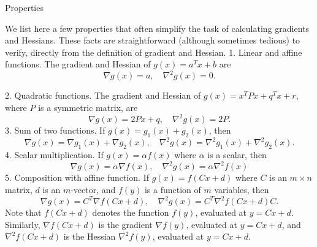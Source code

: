 Properties 


We list here a few properties that often simplify the task of calculating gradients and Hessians. These facts are straightforward (although sometimes tedious) to verify, directly from the definition of gradient and Hessian.
1. Linear and affine functions. The gradient and Hessian of $ g(x)=a^{T} x+b $ are
$$
\nabla g(x)=a, \quad \nabla^{2} g(x)=0 .
$$

2. Quadratic functions. The gradient and Hessian of $ g(x)=x^{T} P x+q^{T} x+r $, where $ P $ is a symmetric matrix, are
$$
\nabla g(x)=2 P x+q, \quad \nabla^{2} g(x)=2 P .
$$
3. Sum of two functions. If $ g(x)=g_{1}(x)+g_{2}(x) $, then
$$
\nabla g(x)=\nabla g_{1}(x)+\nabla g_{2}(x), \quad \nabla^{2} g(x)=\nabla^{2} g_{1}(x)+\nabla^{2} g_{2}(x) .
$$
4. Scalar multiplication. If $ g(x)=\alpha f(x) $ where $ \alpha $ is a scalar, then
$$
\nabla g(x)=\alpha \nabla f(x), \quad \nabla^{2} g(x)=\alpha \nabla^{2} f(x)
$$
5. Composition with affine function. If $ g(x)=f(C x+d) $ where $ C $ is an $ m \times n $ matrix, $ d $ is an $ m $-vector, and $ f(y) $ is a function of $ m $ variables, then
$$
\nabla g(x)=C^{T} \nabla f(C x+d), \quad \nabla^{2} g(x)=C^{T} \nabla^{2} f(C x+d) C .
$$
Note that $ f(C x+d) $ denotes the function $ f(y) $, evaluated at $ y=C x+d $. Similarly, $ \nabla f(C x+d) $ is the gradient $ \nabla f(y) $, evaluated at $ y=C x+d $, and $ \nabla^{2} f(C x+d) $ is the Hessian $ \nabla^{2} f(y) $, evaluated at $ y=C x+d $.

